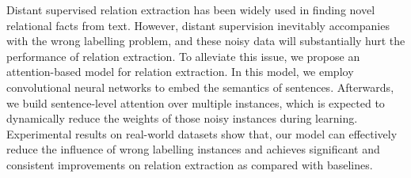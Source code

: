 Distant supervised relation extraction has been widely used in finding novel relational facts from text. However, distant supervision inevitably accompanies with the wrong labelling problem, and these noisy data will substantially hurt the performance of relation extraction. To alleviate this issue, we propose an attention-based model for relation extraction. In this model, we employ convolutional neural networks to embed the semantics of sentences. Afterwards, we build sentence-level attention over multiple instances, which is expected to dynamically reduce the weights of those noisy instances during learning. Experimental results on real-world datasets show that, our model can effectively reduce the influence of wrong labelling instances and achieves significant and consistent improvements on relation extraction as compared with baselines.

